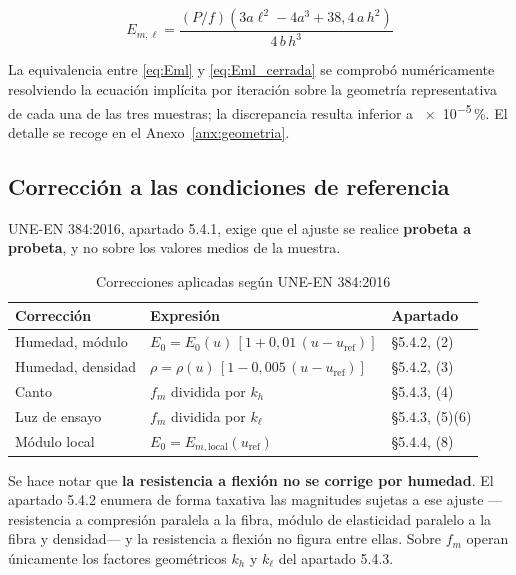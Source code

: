 \documentclass[11pt,a4paper]{article}
\newcommand{\fm}{f_{m}}
\newcommand{\Eml}{E_{m,\ell}}
\newcommand{\Ecero}{E_{0}}
\newcommand{\uref}{u_{\mathrm{ref}}}
\begin{document}
\begin{equation}
\Eml = \frac{(P/f)\left(3a\ell^{2} - 4a^{3} + 38{,}4\,a\,h^{2}\right)}{4\,b\,h^{3}}
\label{eq:Eml_cerrada}
\end{equation}

\noindent La equivalencia entre \eqref{eq:Eml} y \eqref{eq:Eml_cerrada} se comprobó
numéricamente resolviendo la ecuación implícita por iteración sobre la geometría
representativa de cada una de las tres muestras; la discrepancia resulta inferior a
\num{e-5}\,\si{\percent}. El detalle se recoge en el Anexo~\ref{anx:geometria}.

\subsection{Corrección a las condiciones de referencia}
\label{sec:correcciones}

UNE-EN 384:2016, apartado 5.4.1, exige que el ajuste se realice \textbf{probeta a
probeta}, y no sobre los valores medios de la muestra.

\begin{table}[htbp]
\centering
\caption{Correcciones aplicadas según UNE-EN 384:2016}
\begin{tabular}{p{3.3cm}p{7.2cm}l}
\toprule
\textbf{Corrección} & \textbf{Expresión} & \textbf{Apartado} \\
\midrule
Humedad, módulo    & $\Ecero = \Ecero(u)\,[1 + 0{,}01\,(u - \uref)]$      & \S5.4.2, (2) \\
Humedad, densidad  & $\rho = \rho(u)\,[1 - 0{,}005\,(u - \uref)]$          & \S5.4.2, (3) \\
Canto              & $\fm$ dividida por $k_{h}$                            & \S5.4.3, (4) \\
Luz de ensayo      & $\fm$ dividida por $k_{\ell}$                         & \S5.4.3, (5)(6) \\
Módulo local       & $\Ecero = E_{m,\text{local}}(\uref)$                  & \S5.4.4, (8) \\
\bottomrule
\end{tabular}
\end{table}

\noindent Se hace notar que \textbf{la resistencia a flexión no se corrige por
humedad}. El apartado 5.4.2 enumera de forma taxativa las magnitudes sujetas a ese
ajuste ---resistencia a compresión paralela a la fibra, módulo de elasticidad paralelo
a la fibra y densidad--- y la resistencia a flexión no figura entre ellas. Sobre $\fm$
operan únicamente los factores geométricos $k_{h}$ y $k_{\ell}$ del apartado 5.4.3.
\end{document}
